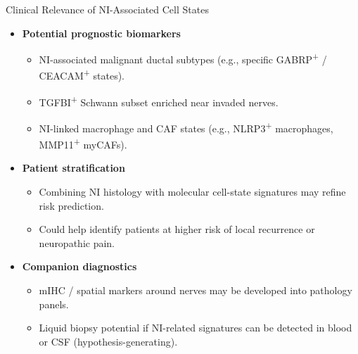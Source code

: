 \documentclass[10pt]{beamer}
\theoremstyle{plain}
\begin{document}
\begin{frame}{Clinical Relevance of NI-Associated Cell States}
  \begin{itemize}
    \item \textbf{Potential prognostic biomarkers}
      \begin{itemize}
        \item NI-associated malignant ductal subtypes (e.g., specific GABRP\textsuperscript{+} / CEACAM\textsuperscript{+} states).
        \item TGFBI\textsuperscript{+} Schwann subset enriched near invaded nerves.
        \item NI-linked macrophage and CAF states (e.g., NLRP3\textsuperscript{+} macrophages, MMP11\textsuperscript{+} myCAFs).
      \end{itemize}
    \item \textbf{Patient stratification}
      \begin{itemize}
        \item Combining NI histology with molecular cell-state signatures may refine risk prediction.
        \item Could help identify patients at higher risk of local recurrence or neuropathic pain.
      \end{itemize}
    \item \textbf{Companion diagnostics}
      \begin{itemize}
        \item mIHC / spatial markers around nerves may be developed into pathology panels.
        \item Liquid biopsy potential if NI-related signatures can be detected in blood or CSF (hypothesis-generating).
      \end{itemize}
  \end{itemize}
\end{frame}
\end{document}
